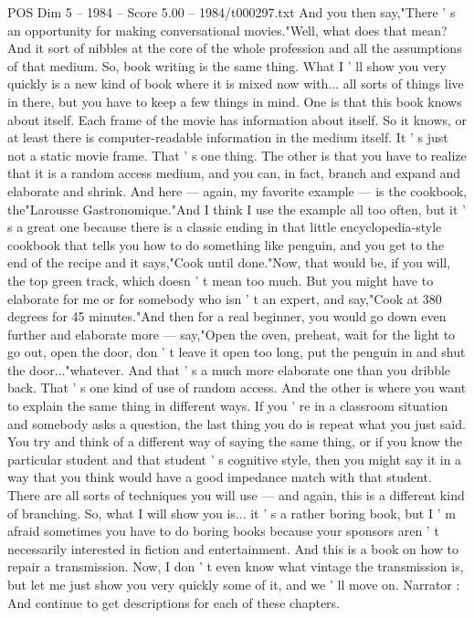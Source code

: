\begin{textsample}{POS Dim 5 – 1984 – Score 5.00 – 1984/t000297.txt}
And you then say,"There ' s an opportunity for making conversational movies."Well, what does that mean?
And it sort of nibbles at the core of the whole profession and all the assumptions of that medium.
So, book writing is the same thing.
What I ' ll show you very quickly is a new kind of book where it is mixed now with... all sorts of things live in there, but you have to keep a few things in mind.
One is that this book knows about itself.
Each frame of the movie has information about itself.
So it knows, or at least there is computer-readable information in the medium itself.
It ' s just not a static movie frame.
That ' s one thing.
The other is that you have to realize that it is a random access medium, and you can, in fact, branch and expand and elaborate and shrink.
And here — again, my favorite example — is the cookbook, the"Larousse Gastronomique."And I think I use the example all too often, but it ' s a great one because there is a classic ending in that little encyclopedia-style cookbook that tells you how to do something like penguin, and you get to the end of the recipe and it says,"Cook until done."Now, that would be, if you will, the top green track, which doesn ' t mean too much.
But you might have to elaborate for me or for somebody who isn ' t an expert, and say,"Cook at 380 degrees for 45 minutes."And then for a real beginner, you would go down even further and elaborate more — say,"Open the oven, preheat, wait for the light to go out, open the door, don ' t leave it open too long, put the penguin in and shut the door..."whatever.
And that ' s a much more elaborate one than you dribble back.
That ' s one kind of use of random access.
And the other is where you want to explain the same thing in different ways.
If you ' re in a classroom situation and somebody asks a question, the last thing you do is repeat what you just said.
You try and think of a different way of saying the same thing, or if you know the particular student and that student ' s cognitive style, then you might say it in a way that you think would have a good impedance match with that student.
There are all sorts of techniques you will use — and again, this is a different kind of branching.
So, what I will show you is... it ' s a rather boring book, but I ' m afraid sometimes you have to do boring books because your sponsors aren ' t necessarily interested in fiction and entertainment.
And this is a book on how to repair a transmission.
Now, I don ' t even know what vintage the transmission is, but let me just show you very quickly some of it, and we ' ll move on.
Narrator : And continue to get descriptions for each of these chapters.

\end{textsample}
